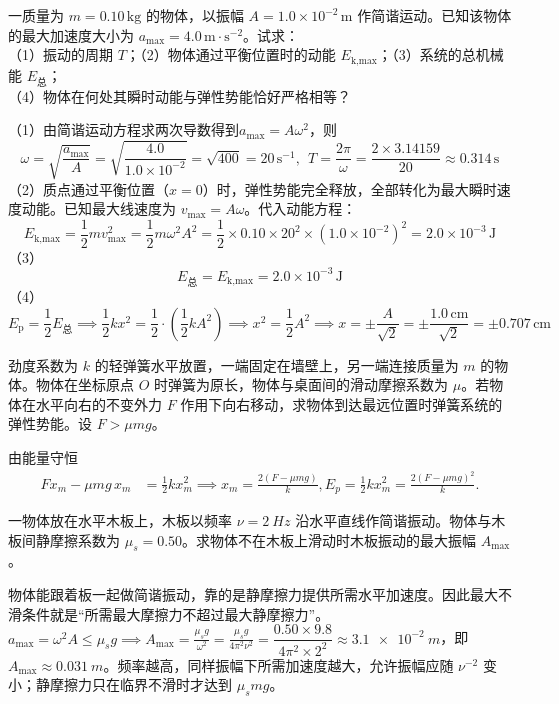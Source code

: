 \documentclass[lang=cn,11pt]{elegantbook}
\begin{document}
\begin{example}
一质量为 $m = 0.10\,\text{kg}$ 的物体，以振幅 $A = 1.0 \times 10^{-2}\,\text{m}$ 作简谐运动。已知该物体的最大加速度大小为 $a_{\text{max}} = 4.0\,\text{m}\cdot\text{s}^{-2}$。试求：\\（1）振动的周期 $T$；（2）物体通过平衡位置时的动能 $E_{\text{k,max}}$；（3）系统的总机械能 $E_{\text{总}}$；\\（4）物体在何处其瞬时动能与弹性势能恰好严格相等？
\end{example}
\begin{solution}
（1）由简谐运动方程求两次导数得到$a_{\text{max}} = A\omega^2$，则$$\omega = \sqrt{\frac{a_{\text{max}}}{A}} = \sqrt{\frac{4.0}{1.0 \times 10^{-2}}} = \sqrt{400} = 20\,\text{s}^{-1},~~T = \frac{2\pi}{\omega} = \frac{2 \times 3.14159}{20} \approx \boxed{0.314\,\text{s}}$$
（2）质点通过平衡位置（$x=0$）时，弹性势能完全释放，全部转化为最大瞬时速度动能。已知最大线速度为 $v_{\text{max}} = A\omega$。代入动能方程：$$E_{\text{k,max}} = \frac{1}{2}m v_{\text{max}}^2 = \frac{1}{2}m\omega^2 A^2= \frac{1}{2} \times 0.10 \times 20^2 \times (1.0 \times 10^{-2})^2 = \boxed{2.0 \times 10^{-3}\,\text{J}}$$
（3）$$E_{\text{总}} = E_{\text{k,max}} = \boxed{2.0 \times 10^{-3}\,\text{J}}$$
（4）$$E_{\text{p}} = \frac{1}{2}E_{\text{总}} \implies \frac{1}{2}k x^2 = \frac{1}{2} \cdot \left( \frac{1}{2}k A^2 \right)\implies x^2 = \frac{1}{2}A^2 \implies x = \pm \frac{A}{\sqrt{2}}= \pm \frac{1.0\,\text{cm}}{\sqrt{2}} = \boxed{\pm 0.707\,\text{cm}}$$
\end{solution}

\begin{exercise}
劲度系数为 \(k\) 的轻弹簧水平放置，一端固定在墙壁上，另一端连接质量为 \(m\) 的物体。物体在坐标原点 \(O\) 时弹簧为原长，物体与桌面间的滑动摩擦系数为 \(\mu\)。若物体在水平向右的不变外力 \(F\) 作用下向右移动，求物体到达最远位置时弹簧系统的弹性势能。设 \(F>\mu mg\)。
\end{exercise}
\begin{solution}
由能量守恒
\[
\begin{aligned}
Fx_m-\mu mg\,x_m&=\frac12kx_m^2
\implies x_m=\frac{2(F-\mu mg)}{k},E_p=\frac12kx_m^2=\frac{2(F-\mu mg)^2}{k}.
\end{aligned}
\]
\end{solution}

\begin{exercise}[木板简谐振动时物体不滑的最大振幅]
一物体放在水平木板上，木板以频率 \(\nu=\SI{2}{Hz}\) 沿水平直线作简谐振动。物体与木板间静摩擦系数为 \(\mu_s=0.50\)。求物体不在木板上滑动时木板振动的最大振幅 \(A_{\max}\)。
\end{exercise}
\begin{solution}
物体能跟着板一起做简谐振动，靠的是静摩擦力提供所需水平加速度。因此最大不滑条件就是“所需最大摩擦力不超过最大静摩擦力”。
 \(a_{\max}=\omega^2A\le \mu_sg \implies A_{\max}=\frac{\mu_s g}{\omega^2} =\frac{\mu_s g}{4\pi^2\nu^2}=\dfrac{0.50\times9.8}{4\pi^2\times2^2}\approx \SI{3.1e-2}{m}\)，即 \(A_{\max}\approx\SI{0.031}{m}\)。频率越高，同样振幅下所需加速度越大，允许振幅应随 \(\nu^{-2}\) 变小；静摩擦力只在临界不滑时才达到 \(\mu_smg\)。
\end{solution}
\end{document}
